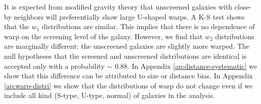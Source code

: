 \documentclass[useAMS,usenatbib,twocolumn]{mn2e}
\newcommand{\jakesays}[1]{{\color{red}[Jake says: #1]}}
\newcommand{\vinusays}[1]{{\color{blue}[Vinu says: #1]}}
\begin{document}
It is expected from modified gravity theory that unscreened galaxies with
close-by neighbors will preferentially show large U-shaped warps.
A K-S test shows that the $w_1$ distributions are similar. This
implies that there is no dependence of warp on the screening level of the
galaxy. 
However, we find that $w_2$ distributions are
marginally different: the unscreened galaxies are slightly more warped. The
null hypotheses that the screened and unscreened distributions are identical is
accepted only with a probability $\sim$ 0.88.
In Appendix \ref{ap:distance-systematic} we show that this difference can be
attributed to size or
distance bias. In Appendix \ref{ap:warp-distri} we show that the distributions
of warp
do not change even if we include all kind (S-type, U-type, normal) of
galaxies in the analysis.
\end{document}
